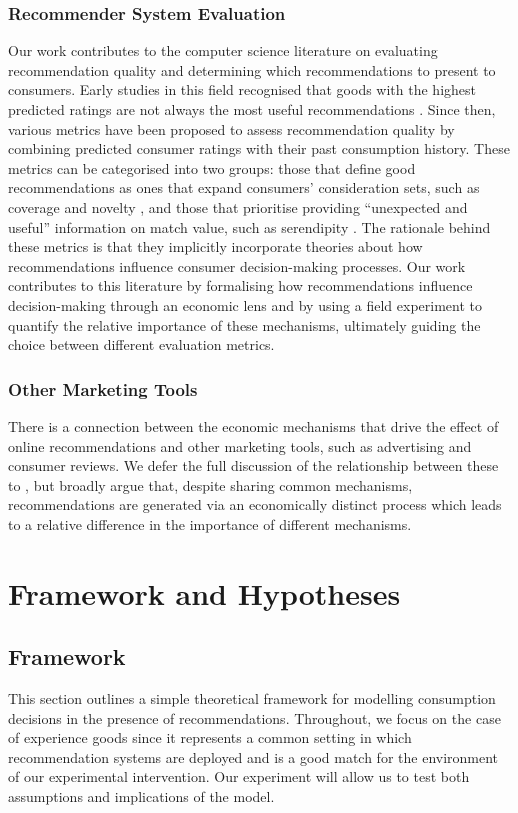 \documentclass[12pt]{article}
\theoremstyle{newtheorem}
\begin{document}
\subsubsection{Recommender System Evaluation} 
Our work contributes to the computer science literature on evaluating recommendation quality and determining which recommendations to present to consumers. Early studies in this field recognised that goods with the highest predicted ratings are not always the most useful recommendations \citep{McNeeRiedlKonstan2006}. Since then, various metrics have been proposed to assess recommendation quality by combining predicted consumer ratings with their past consumption history. These metrics can be categorised into two groups: those that define good recommendations as ones that expand consumers' consideration sets, such as coverage and novelty \citep{KaminskasBridge2016TiiS, CastellsHurleyVargas2015}, and those that prioritise providing ``unexpected and useful'' information on match value, such as serendipity \citep{KotkovWangVeijalainen2016KBS}. The rationale behind these metrics is that they implicitly incorporate theories about how recommendations influence consumer decision-making processes. Our work contributes to this literature by formalising how recommendations influence decision-making through an economic lens and by using a field experiment to quantify the relative importance of these mechanisms, ultimately guiding the choice between different evaluation metrics.


\subsubsection{Other Marketing Tools} 
There is a connection between the economic mechanisms that drive the effect of online recommendations and other marketing tools, such as advertising and consumer reviews. 
We defer the full discussion of the relationship between these to , but broadly argue that, despite sharing common mechanisms, recommendations are generated via an economically distinct process which leads to a relative difference in the importance of different mechanisms.



\section{Framework and Hypotheses}
\label{section:framework}

\subsection{Framework}
\label{section:framework:framework}
This section outlines a simple theoretical framework for modelling consumption decisions in the presence of recommendations. 
Throughout, we focus on the case of experience goods since it represents a common setting in which recommendation systems are deployed and is a good match for the environment of our experimental intervention. 
Our experiment will allow us to test both assumptions and implications of the model. 
\end{document}
